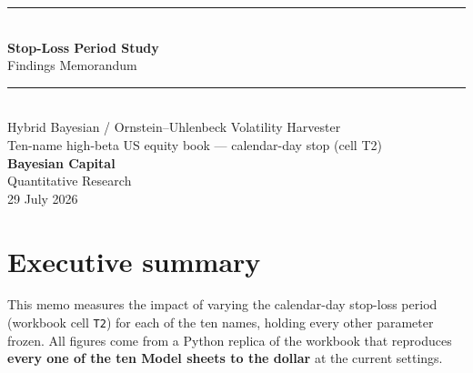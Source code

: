 \documentclass[11pt]{article}
\begin{document}
\begin{titlepage}
\vspace*{1.2cm}
{\color{bcgold}\rule{\textwidth}{2pt}}\\[0.4cm]
{\color{bcnavy}\Huge\bfseries Stop-Loss Period Study}\\[0.35cm]
{\color{bcblue}\LARGE Findings Memorandum}\\[0.5cm]
{\color{bcgold}\rule{\textwidth}{1pt}}\\[0.6cm]
{\large\color{bcgrey} Hybrid Bayesian / Ornstein--Uhlenbeck Volatility Harvester}\\[0.2cm]
{\large\color{bcgrey} Ten-name high-beta US equity book --- calendar-day stop (cell T2)}\\[1.2cm]
{\color{bcnavy}\large\bfseries Bayesian Capital}\\[0.15cm]
{\color{bcgrey} Quantitative Research}\\[0.15cm]
{\color{bcgrey} 29 July 2026}\\[2cm]

\end{titlepage}

\section{Executive summary}

This memo measures the impact of varying the calendar-day stop-loss period (workbook cell
\texttt{T2}) for each of the ten names, holding every other parameter frozen. All figures come
from a Python replica of the workbook that reproduces \textbf{every one of the ten Model sheets
to the dollar} at the current settings.
\end{document}
